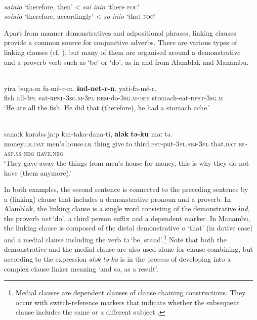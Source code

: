 \documentclass[output=paper,colorlinks,citecolor=brown]{langscibook}
\begin{document}
\ea\label{ex:diessel:28}
\\
\ea  \textit{sainio} ‘therefore, then’ < \textit{sai} \textit{inio} ‘there \textsc{foc’}\\
\ex  \textit{soinio} ‘therefore, accordingly’ < \textit{so} \textit{inio} ‘that \textsc{foc’}\\
\z
\z

Apart from manner demonstratives and adpositional phrases, linking clauses provide a common source for conjunctive adverbs. There are various types of linking clauses (cf. \citealt{Guérin2019}), but many of them are organised around a demonstrative and a proverb verb such as ‘be’ or ‘do’, as in  and  from Alamblak and Manambu.

\ea\label{ex:diessel:29}
\\
\gll yira   buga-m   fa-më-r-m.     {\ob}\textbf{ɨnd-net-r-n},   yati-fa-më-r.{\cb}\\
     fish   all-3\textsc{pl}   eat-\textsc{rpst}-3\textsc{sg.m}-3\textsc{pl}   {\db}\textsc{dem}-do-3\textsc{sg.m}-\textsc{dep} stomach-eat-\textsc{rpst-3sg.m}\\
\glt ‘He ate all the fish. He did that (therefore), he had a stomach ache.’
\z

\ea\label{ex:diessel:30}
\\
\gll sanaːk   karabə    jaːp  kui-taka-dana-ti, {\ob}\textbf{alək}    \textbf{tə-ku}    maː  tə{\cb}.\\ 
money.\textsc{lk.dat}   men’s.house.\textsc{lk}  thing give.to.third.\textsc{pst}-put-\textsc{3pl.sbj-3pl} {\db}that.\textsc{dat} \textsc{be-asp.ss}  \textsc{neg} \textsc{have.neg}\\
\glt ‘They gave away the things from men’s house for money, this is why they do not have (them anymore).’
\z

In both examples, the second sentence is connected to the preceding sentence by a (linking) clause that includes a demonstrative pronoun and a proverb. In Alamblak, the linking clause is a single word consisting of the demonstrative \textit{ɨnd}, the proverb \textit{net} ‘do’, a third person suffix and a dependent marker. In Manambu, the linking clause is composed of the distal demonstrative \textit{a} ‘that’ (in dative case) and a medial clause including the verb \textit{tə} ‘be, stand’.\footnote{Medial clauses are dependent clauses of clause chaining constructions. They occur with switch-reference markers that indicate whether the subsequent clause includes the same or a different subject \citep{HaimanMunro1983}.} Note that both the demonstrative and the medial clause are also used alone for clause combining, but according to \citet[494]{Aikhenvald2008} the expression \textit{alək tə-ku} is in the process of developing into a complex clause linker meaning ‘and so, as a result’. 
\end{document}
